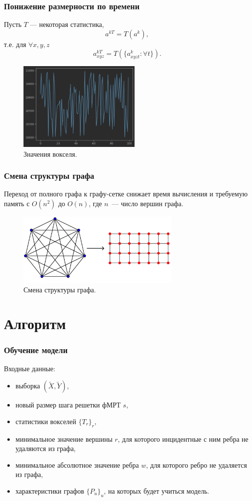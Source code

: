 \documentclass{beamer}
\begin{document}
	\begin{frame} 
		\frametitle{Понижение размерности по времени}
		Пусть $T$ --- некоторая статистика,
		\[
		a^{kT} = T(a^k),
		\]
		т.е. для $\forall x, y, z$
		\[
		a^{kT}_{xyz} = T(\{a_{xyzt}^k : \forall t\}).
		\]
		
		\begin{figure}
			\includegraphics[width=6cm]{../images/time_series.png}
			\caption{Значения вокселя.} 
			\label{fg:11}
		\end{figure}	
	\end{frame}	

	\begin{frame} 
		\frametitle{Смена структуры графа}
		
		Переход от полного графа к графу-сетке снижает время вычисления и требуемую память с $O(n^2)$ до $O(n)$, где $n$~--- число вершин графа.
		
		\vspace{0.5cm}
						
		\begin{figure}
			\includegraphics[width=8cm]{../images/full_grid_graphs_1.pdf}
			\caption{Смена структуры графа.} 
			\label{fg:9}
		\end{figure}			
	\end{frame}	

	\section{Алгоритм}
	\begin{frame} 
		\frametitle{Обучение модели}
		Входные данные:
		\begin{itemize}
			\item выборка $(\widetilde{X}, \widetilde{Y})$,
			\item новый размер шага решетки фМРТ $s$,
			\item статистики вокселей $\{T_r\}_r$,
			\item минимальное значение вершины $r$, для которого инцидентные с ним ребра не удаляются из графа,
			\item минимальное абсолютное значение ребра $w$, для которого ребро не удаляется из графа,
			\item характеристики графов $\{P_u\}_u$, на которых будет учиться модель.
		\end{itemize}
	\end{frame}
\end{document}
